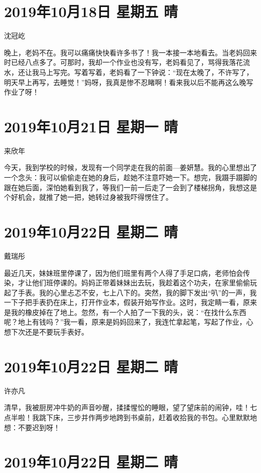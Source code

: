 \section{2019年10月18日 星期五 晴}

沈冠屹

晚上，老妈不在。我可以痛痛快快看许多书了！我一本接一本地看去。当老妈回来时已经八点多了。可那时，我却一个作业也没有写，老妈看见了，骂得我落花流水，还让我马上写完。写着写着，老妈看了一下钟说：“现在太晚了，不许写了，明天早上再写，去睡觉！”妈呀，我真是惨不忍睹啊！看来我以后不能再这么晚写作业了呀！

\section{2019年10月21日 星期一 晴}

来欣年

今天，我到学校的时候，发现有一个同学走在我的前面---姜妍慧。我的心里想出了一个念头：我可以偷偷走在她的身后，趁她不注意吓她一下。想完，我蹑手蹑脚的跟在她后面，深怕她看到我了，等我们一前一后走了一会到了楼梯拐角，我想这是个好机会，就推了她一把，她转过身被我吓得愣住了。

\section{2019年10月22日 星期二 晴}

戴瑞彤

最近几天，妹妹班里停课了，因为他们班里有两个人得了手足口病，老师怕会传染，才让他们班停课的。妈妈正带着妹妹出去玩，我趁着这个功夫，在家里偷偷玩起了手表。我的心里忐忑不安，七上八下的。突然，我的脚下发出“叭”的一声，我一下子把手表扔在床上，打开作业本，假装开始写作业。这时，我定睛一看，原来是我的橡皮掉在了地上。忽然，有一个人拍了一下我的头，说：“在找什么东西呢？地上有钱吗？”我一看，原来是妈妈回来了，我连忙拿起笔，写起了作业，心想下次还是不要玩手表好。

\section{2019年10月22日 星期二 晴}

许亦凡

清早，我被厨房冲牛奶的声音吵醒，揉揉惺忪的睡眼，望了望床前的闹钟，哇！七点半啦！我跳下床，三步并作两步地跨到书桌前，赶着收拾我的书包。心里默默地想：不要迟到呀！

\section{2019年10月22日 星期二 晴}

